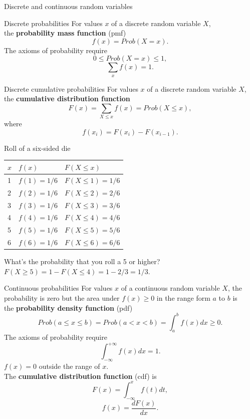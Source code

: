 \documentclass[11pt,table]{beamer}
\begin{document}
\begin{frame}{Discrete and continuous random variables}
\begin{minipage}{0.35\linewidth}
\end{minipage}
\end{frame}

\begin{frame}{Discrete probabilities}
For values $x$ of a discrete random variable $X$,\\ the \textbf{probability mass function} (pmf)
$$f(x)=Prob(X=x).$$
The axioms of probability require
$$0\leq Prob(X=x)\leq1,$$
$$\sum_x f(x)=1.$$
\end{frame}

\begin{frame}{Discrete cumulative probabilities}
For values $x$ of a discrete random variable $X$,\\ the \textbf{cumulative distribution function}
$$F(x)=\sum_{X\leq x}f(x)=Prob(X\leq x),$$
where
$$f(x_i)=F(x_i)-F(x_{i-1}).$$
\begin{example} 
\scriptsize
\renewcommand{\baselinestretch}{1}
Roll of a six-sided die
\vspace{-5mm}

\renewcommand{\baselinestretch}{1}
	\begin{center}
		\begin{threeparttable}[htbp]

\label{tab:timeline}
\scriptsize
		\begin{tabular}{lll}
\toprule
$x$ & $f(x)$ & $F(X\leq x)$\\
\midrule
1 & $f(1)=1/6$ & $F(X\leq 1)=1/6$\\
2 & $f(2)=1/6$ & $F(X\leq 2)=2/6$\\
3 & $f(3)=1/6$ & $F(X\leq 3)=3/6$\\
4 & $f(4)=1/6$ & $F(X\leq 4)=4/6$\\
5 & $f(5)=1/6$ & $F(X\leq 5)=5/6$\\
6 & $f(6)=1/6$ & $F(X\leq 6)=6/6$\\
\bottomrule
		\end{tabular}

	\end{threeparttable}
\end{center}
\renewcommand{\baselinestretch}{1.45}
What's the probability that you roll a 5 or higher? $F(X\geq 5) = 1 - F(X\leq 4) = 1-2/3 = 1/3.$
\end{example}

\end{frame}

\begin{frame}{Continuous probabilities}
For values $x$ of a continuous random variable $X$, the probability is zero but the area under $f(x)\geq0$ in the range form $a$ to $b$ is\\ the \textbf{probability density function} (pdf)
$$Prob(a\leq x\leq b)=Prob(a< x< b)=\int_a^bf(x)dx\geq 0.$$
The axioms of probability require
$$\int^{+\infty}_{-\infty} f(x)dx=1.$$
$f(x)=0$ outside the range of $x$.\\
The \textbf{cumulative distribution function} (cdf) is
$$F(x)=\int_{-\infty}^x f(t)dt,$$
$$f(x)=\frac{dF(x)}{dx}.$$
\end{frame}
\end{document}
